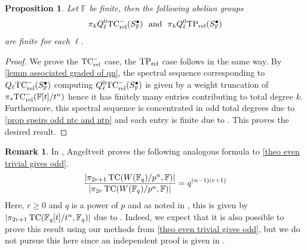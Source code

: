 \documentclass[english,10pt]{amsart}
\newcommand{\rel}{\textup{rel}}
\newcommand{\field}{\mathbb{F}}
\newtheorem{prop}{Proposition}[section]
\theoremstyle{definition}
\newtheorem{rema}{Remark}[section]
\numberwithin{equation}{section}
\DeclareMathOperator{\tc}{\ensuremath{\textup{TC}}}
\newcommand{\rntc}{\mathrm{TC}_{\rel}^{-}}
\newcommand{\rtp}{\mathrm{TP}_{\rel}}
\newcommand{\pis}{\pi_*}
\begin{document}
\begin{prop}\label{prop finiteness for ntc and tp of truncated witt}
Let $\field$ be finite, then the following abelian groups
\[ \pi_{k}Q_\ell^0 \rntc(S_{\field}^{\bullet}) \textup{\ \ and \ } \pi_{k}Q_\ell^0 \rtp(S_{\field}^{\bullet}) \]
are finite for each $\ell$.
\end{prop}
\begin{proof}
We prove the $\rntc$ case, the $\rtp$ case follows in the same way. By \autoref{lemm associated graded of qn}, the spectral sequence corresponding to $Q_\ell \rntc(S_{\field}^{\bullet})$ computing $Q_\ell^0 \rntc(S_{\field}^{\bullet})$ is given by a weight truncation of $\pis \rntc(\field[t]/t^n)$ hence it has finitely many entries contributing to total degree $k$. Furthermore, this spectral sequence is concentrated in odd total degrees due to \autoref{prop speirs odd ntc and ntp} and each entry is finite due to \cite[Propositions 12 and 13]{speirs2020truncatedpolynomial}. This proves the desired result. 
\end{proof}

\begin{rema}\label{rema angeltveit quotient}
In \cite{Angeltveit2015kTheoryfinitewitt}, Angeltveit proves the following analogous formula to \autoref{theo even trivial gives odd}. 
\[\frac{\lvert \pi_{2r+1}\tc(W(\field_q)/p^n,\field)\rvert }{\lvert \pi_{2r} \tc (W(\field_q)/p^n,\field)\rvert } = q^{(n-1)(r+1)} \]
Here, $r\geq 0$ and  $q$ is a power of $p$ and as noted in \cite{Angeltveit2015kTheoryfinitewitt},  this is given by $\lvert \pi_{2r+1}\tc(\field_q[t]/t^n,\field_q)\rvert $ due to \cite{hesselholt1997kthryoftruncated}. Indeed, we expect that it is also possible to prove this result using our methods from \autoref{theo even trivial gives odd}, but we do not pursue this here since an independent proof is given in \cite[Proposition 1.5]{AKN24}.
\end{rema}
\end{document}
